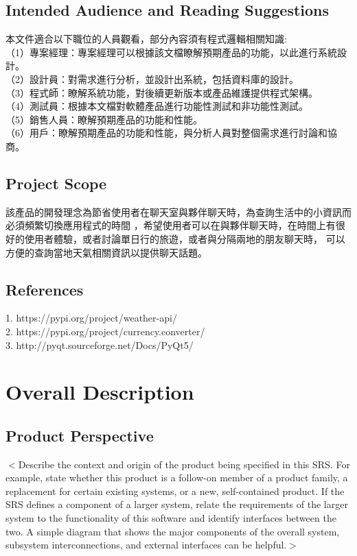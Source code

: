 \documentclass{scrreprt}
\begin{document}
\begin{CJK}{UTF8}{bkai}
\section{Intended Audience and Reading Suggestions}
本文件適合以下職位的人員觀看，部分內容須有程式邏輯相關知識: \\
（1）專案經理：專案經理可以根據該文檔瞭解預期產品的功能，以此進行系統設計。 \\
（2）設計員：對需求進行分析，並設計出系統，包括資料庫的設計。 \\
（3）程式師：瞭解系統功能，對後續更新版本或產品維護提供程式架構。 \\
（4）測試員：根據本文檔對軟體產品進行功能性測試和非功能性測試。 \\
（5）銷售人員：瞭解預期產品的功能和性能。 \\
（6）用戶：瞭解預期產品的功能和性能，與分析人員對整個需求進行討論和協商。 \\


\section{Project Scope}
該產品的開發理念為節省使用者在聊天室與夥伴聊天時，為查詢生活中的小資訊而必須頻繁切換應用程式的時間
，希望使用者可以在與夥伴聊天時，在時間上有很好的使用者體驗，或者討論單日行的旅遊，或者與分隔兩地的朋友聊天時，
可以方便的查詢當地天氣相關資訊以提供聊天話題。

\section{References}
1. https://pypi.org/project/weather-api/ \\
2. https://pypi.org/project/currency.converter/ \\
3. http://pyqt.sourceforge.net/Docs/PyQt5/ \\



\chapter{Overall Description}

\section{Product Perspective}
$<$Describe the context and origin of the product being specified in this SRS.  
For example, state whether this product is a follow-on member of a product 
family, a replacement for certain existing systems, or a new, self-contained 
product. If the SRS defines a component of a larger system, relate the 
requirements of the larger system to the functionality of this software and 
identify interfaces between the two. A simple diagram that shows the major 
components of the overall system, subsystem interconnections, and external 
interfaces can be helpful.$>$


\end{CJK}
\end{document}
